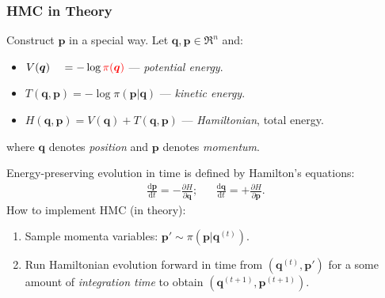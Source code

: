 \documentclass[xcolor=dvipsnames]{beamer}
\begin{document}
\begin{frame}
\frametitle{HMC in Theory}
Construct $\bm{p}$ in a special way. Let $\bm{q},\bm{p}\in \Re^n$ and:
\begin{itemize}
\item[] $V(\bm{q})\phantom{,\bm{p}} = -\log {\color{red}\pi(\bm{q})}$ --- \emph{potential energy}.
\item[] $T(\bm{q}, \bm{p}) = - \log \pi(\bm{p} | \bm{q})$ --- \emph{kinetic energy}.
\item[] $H(\bm{q}, \bm{p}) = V(\bm{q}) + T(\bm{q}, \bm{p})$ --- \emph{Hamiltonian}, total energy.
\end{itemize}
where $\bm{q}$ denotes {\color{red}\emph{position}} and $\bm{p}$ denotes {\color{red}\emph{momentum}}.

\vspace{0.3cm}

Energy-preserving evolution in time is defined by Hamilton's equations:
\begin{align*}
\frac{\mathrm{d}\bm{p}}{\mathrm{d} t} = - \frac{\partial H}{\partial \bm{q}}; && \frac{\mathrm{d}\bm{q}}{\mathrm{d} t} = + \frac{\partial H}{\partial \bm{p}}.
\end{align*}
How to implement HMC (in theory):
\begin{enumerate}
\item Sample momenta variables: $\bm{p}' \sim \pi(\bm{p}|\bm{q}^{(t)})$.
\item Run Hamiltonian evolution forward in time from $(\bm{q}^{(t)}, \bm{p}')$ for a some amount of {\color{red}\emph{integration time}} to obtain $(\bm{q}^{(t+1)}, \bm{p}^{(t+1)})$.
\end{enumerate}
\end{frame}
\end{document}
